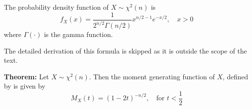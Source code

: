 \documentclass[twoside]{book}
\begin{document}
\begin{textbox}
The probability density function of $X \sim \chi^2(n)$ is
$$f_X(x) = \frac{1}{2^{n/2}\Gamma(n/2)} x^{n/2-1} e^{-x/2}, \quad x > 0$$
where $\Gamma(\cdot)$ is the gamma function.
\end{textbox}

The detailed derivation of this formula is skipped as it is outside the scope of the text.

%
%
%
%
%

\begin{textbox}
\textbf{Theorem:} Let \( X \sim \chi^2(n) \). Then the moment generating function of \( X \), defined by is given by
\[
M_X(t) = (1 - 2t)^{-n/2}, \quad \text{for } t < \frac{1}{2}
\]
\end{textbox}
\end{document}
